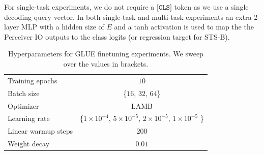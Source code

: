 \documentclass{article} %
\newcommand{\ourmodel}{Perceiver IO\xspace}
\begin{document}
For single-task experiments, we do not require a $\texttt{[CLS]}$ token as we use a single decoding query vector. In both single-task and multi-task experiments an extra 2-layer MLP with a hidden size of $E$ and a $\textrm{tanh}$ activation is used to map the the \ourmodel{} outputs to the class logits (or regression target for STS-B).


\begin{table}[h]
\centering
 \begin{tabular}{l c}
 \toprule
    Training epochs & $10$ \\
    Batch size & \{$16$, $32$, $64$\} \\ 
 \midrule
    Optimizer & LAMB \\
    Learning rate & \{$1{\times}10^{-4}$, $5{\times}10^{-5}$, $2{\times}10^{-5}$, $1{\times}10^{-5}$ \} \\
    Linear warmup steps & $200$ \\
    Weight decay & $0.01$ \\
 \bottomrule
\end{tabular}
\vspace{1mm}
\caption{\small Hyperparameters for GLUE finetuning experiments. We sweep over the values in brackets.}
\end{table}
\end{document}
